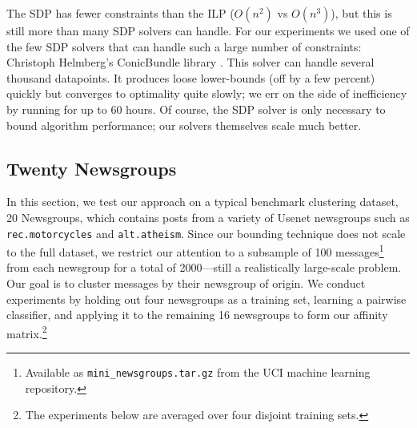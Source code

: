 \documentclass[11pt]{article}
\begin{document}
The SDP has fewer constraints than the ILP ($O(n^2)$ vs $O(n^3)$), but
this is still more than many SDP solvers can handle. For our
experiments we used one of the few SDP solvers that can handle such a
large number of constraints: Christoph Helmberg's ConicBundle library \cite{Helmberg09,Helmberg00}. This solver can handle several
thousand datapoints. It produces loose lower-bounds (off by a few
percent) quickly but converges to optimality quite slowly; we err on
the side of inefficiency by running for up to 60 hours. Of course, the
SDP solver is only necessary to bound algorithm performance; our
solvers themselves scale much better.






\subsection{Twenty Newsgroups}

In this section, we test our approach on a typical benchmark
clustering dataset, 20 Newsgroups, which contains posts from a variety
of Usenet newsgroups such as \texttt{rec.motorcycles} and
\texttt{alt.atheism}. Since our bounding technique does not scale to
the full dataset, we restrict our attention to a subsample of 100
messages\footnote{Available as \texttt{mini\_newsgroups.tar.gz} from
  the UCI machine learning repository.}  from each newsgroup for a
total of 2000---still a realistically large-scale problem. Our goal is
to cluster messages by their newsgroup of origin. We conduct
experiments by holding out four newsgroups as a training set, learning
a pairwise classifier, and applying it to the remaining 16 newsgroups
to form our affinity matrix.\footnote{The experiments below are
  averaged over four disjoint training sets.}
\end{document}
